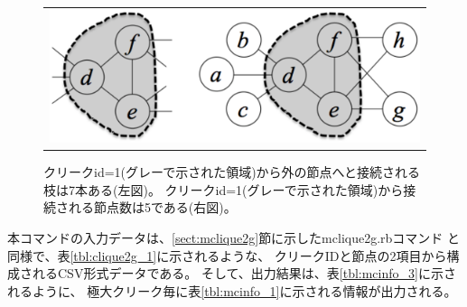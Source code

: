 \begin{figure}[htbp]
\begin{center}
\begin{tabular}{c}

\begin{minipage}{0.5\hsize}
\begin{center}
\includegraphics[scale=0.3]{./mcinfo_3.eps}
\caption{クリークid=1(グレーで示された領域)から外の節点へと接続される枝は7本ある(左図)。
クリークid=1(グレーで示された領域)から接続される節点数は5である(右図)。
\label{fig:mcinfo_3}}
\end{center}
\end{minipage}

\end{tabular} 
\end{center}
\end{figure} 

本コマンドの入力データは、\ref{sect:mclique2g}節に示したmclique2g.rbコマンド
と同様で、表\ref{tbl:clique2g_1}に示されるような、
クリークIDと節点の2項目から構成されるCSV形式データである。
そして、出力結果は、表\ref{tbl:mcinfo_3}に示されるように、
極大クリーク毎に表\ref{tbl:mcinfo_1}に示される情報が出力される。

